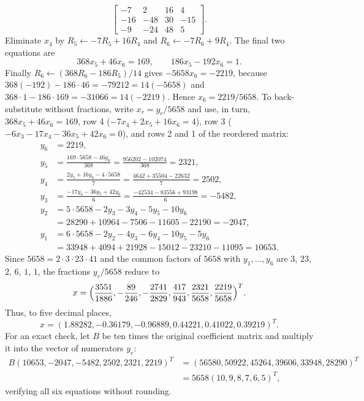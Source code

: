 \[
\left[\begin{array}{rrr|r}
-7&2&16&4\\
-16&-48&30&-15\\
-9&-24&48&5
\end{array}\right].
\]
Eliminate $x_4$ by
$R_5\leftarrow-7R_5+16R_4$ and
$R_6\leftarrow-7R_6+9R_4$. The final two equations are
\[
368x_5+46x_6=169,\qquad186x_5-192x_6=1.
\]
Finally $R_6\leftarrow(368R_6-186R_5)/14$ gives
$-5658x_6=-2219$, because
$368(-192)-186\cdot46=-79212=14(-5658)$ and
$368\cdot1-186\cdot169=-31066=14(-2219)$.
Hence $x_6=2219/5658$. To back-substitute without fractions, write
$x_r=y_r/5658$ and use, in turn, $368x_5+46x_6=169$,
row 4 ($-7x_4+2x_5+16x_6=4$), row 3
($-6x_3-17x_4-36x_5+42x_6=0$), and rows 2 and 1 of the reordered
matrix:
\[
\begin{aligned}
y_6&=2219,\\
y_5&=\frac{169\cdot5658-46y_6}{368}
=\frac{956202-102074}{368}=2321,\\
y_4&=\frac{2y_5+16y_6-4\cdot5658}{7}
=\frac{4642+35504-22632}{7}=2502,\\
y_3&=\frac{-17y_4-36y_5+42y_6}{6}
=\frac{-42534-83556+93198}{6}=-5482,\\
y_2&=5\cdot5658-2y_3-3y_4-5y_5-10y_6\\
&=28290+10964-7506-11605-22190=-2047,\\
y_1&=6\cdot5658-2y_2-4y_3-6y_4-10y_5-5y_6\\
&=33948+4094+21928-15012-23210-11095=10653.
\end{aligned}
\]
Since $5658=2\cdot3\cdot23\cdot41$ and the common factors of $5658$ with
$y_1,\ldots,y_6$ are $3$, $23$, $2$, $6$, $1$, $1$, the fractions
$y_r/5658$ reduce to
\[
x=\Bigl(\frac{3551}{1886},-\frac{89}{246},-\frac{2741}{2829},
\frac{417}{943},\frac{2321}{5658},\frac{2219}{5658}\Bigr)^T.
\]
Thus, to five decimal places,
\[
\boxed{x=(1.88282,-0.36179,-0.96889,0.44221,0.41022,0.39219)^T}.
\]
For an exact check, let $B$ be ten times the original coefficient
matrix and multiply it into the vector of numerators $y_r$:
\[
\begin{aligned}
B(10653,-2047,-5482,2502,2321,2219)^T
&=(56580,50922,45264,39606,33948,28290)^T\\
&=5658(10,9,8,7,6,5)^T,
\end{aligned}
\]
verifying all six equations without rounding.

